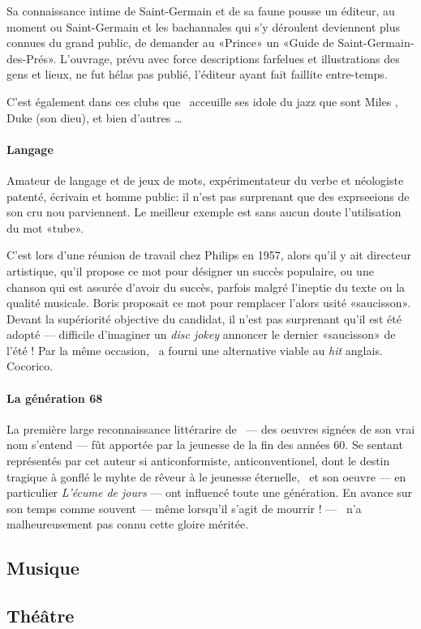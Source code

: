 Sa connaissance intime de Saint-Germain et de sa faune pousse un éditeur, au moment
ou Saint-Germain et les bachannales qui s'y déroulent deviennent plus connues du
grand public, de demander au «Prince» un «Guide de Saint-Germain-des-Prés».
L'ouvrage, prévu avec force descriptions farfelues et illustrations des gens et
lieux, ne fut hélas pas publié, l'éditeur ayant fait faillite entre-temps.

C'est également dans ces clubs que \BV\ acceuille ses idole du jazz que sont
Miles , Duke  (son dieu), et bien d'autres \ldots

\paragraph{Langage}

Amateur de langage et de jeux de mots, expérimentateur du verbe et néologiste
patenté, écrivain et homme public: il n'est pas surprenant que des exprseeions
de son cru nou parviennent.
Le meilleur exemple est sans aucun doute l'utilisation du mot «tube».

C'est lors d'une réunion de travail chez Philips en 1957, alors qu'il y ait
directeur artistique, qu'il propose ce mot pour désigner un succès populaire,
ou une chanson qui est assurée d'avoir du succès, parfois malgré l'ineptie du
texte ou la qualité musicale. Boris proposait ce mot pour remplacer l'alors
usité «saucisson». Devant la supériorité objective du candidat, il n'est pas
surprenant qu'il est été adopté --- difficile d'imaginer un \emph{disc jokey}
annoncer le dernier «saucisson» de l'été ! Par la même occasion, \BV\ a
fourni une alternative viable au \emph{hit} anglais. Cocorico.

\paragraph{La génération 68}

La première large reconnaissance littérarire de \BV\ --- des oeuvres signées
de son vrai nom s'entend --- fût apportée par la jeunesse de la fin des années 60.
Se sentant représentés par cet auteur si anticonformiste, anticonventionel, dont
le destin tragique à gonflé le myhte de rêveur à le jeunesse éternelle, \BV\ 
et son oeuvre --- en particulier \emph{L'écume de jours} --- ont influencé toute une
génération. En avance sur son temps comme souvent --- même lorsqu'il s'agit de
mourrir ! --- \BV\ n'a malheureusement pas connu cette gloire méritée.

\subsection{Musique}

\subsection{Théâtre}


